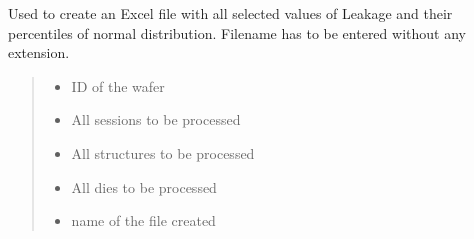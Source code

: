 \documentclass[letterpaper,10pt,english]{sphinxmanual}
\begin{document}
\begin{fulllineitems}
\label{\detokenize{excel:excel.excel_normal_Leak}}
\pysigstartsignatures
{}
\pysigstopsignatures
\sphinxAtStartPar
Used to create an Excel file with all selected values of Leakage and their percentiles of normal distribution.
Filename has to be entered without any extension.
\begin{quote}\begin{description}
\begin{itemize}
\item {} 
\sphinxAtStartPar
{} \textendash{} ID of the wafer

\item {} 
\sphinxAtStartPar
{} \textendash{} All sessions to be processed

\item {} 
\sphinxAtStartPar
{} \textendash{} All structures to be processed

\item {} 
\sphinxAtStartPar
{} \textendash{} All dies to be processed

\item {} 
\sphinxAtStartPar
{} \textendash{} name of the file created

\end{itemize}

\end{description}\end{quote}

\end{fulllineitems}

\end{document}
